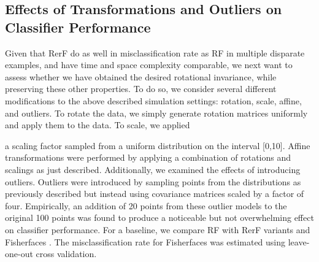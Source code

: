 \documentclass{article} %
\begin{document}
\subsection{Effects of Transformations and Outliers on Classifier Performance}

Given that RerF do as well in misclassification rate as RF in multiple disparate examples, and have time and space complexity comparable, we next want to assess whether we have obtained the desired rotational invariance, while preserving these other properties.  To do so, we consider several different modifications to the above described simulation settings: rotation, scale, affine, and outliers.  To rotate the data, we simply generate rotation matrices uniformly and apply them to the data.  To scale, we applied 

a scaling factor sampled from a uniform distribution on the interval [0,10]. 
Affine transformations were performed by applying a combination of rotations and scalings as just described. Additionally, we examined the effects of introducing outliers. Outliers were introduced by sampling points from the distributions as previously described but instead using covariance matrices scaled by a factor of four. Empirically, an addition of 20 points from these outlier models to the original 100 points was found to produce a noticeable but not overwhelming effect on classifier performance. For a baseline, we compare RF with RerF variants and Fisherfaces \cite{Fisherfaces}. The misclassification rate for Fisherfaces was estimated using leave-one-out cross validation. 
\end{document}
